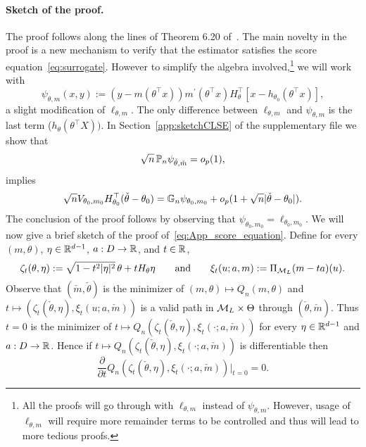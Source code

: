 {\paragraph{Sketch of the proof.} The proof follows along the lines of Theorem 6.20 of~\cite{VdV02}. The main novelty in the proof is a new mechanism to verify that the estimator satisfies the score equation~\eqref{eq:surrogate}.  However to simplify the algebra involved,\footnote{All the proofs will go through with $\ell_{\theta,m}$ instead of $\psi_{\theta, m}$. However, usage of $\ell_{\theta, m}$ will require more remainder terms to be controlled and thus will lead to more tedious proofs.} we will work with 
\begin{equation} \label{eq:App_score}
 \psi_{\theta,m} (x,y) := (y-m(\theta^\top x))m^\prime(\theta^\top x) H_\theta^\top [  x -h_{\theta_0}(\theta^\top x)],
 \end{equation}
 a slight modification of $\ell_{\theta, m}$. The only difference between $\ell_{\theta, m}$ and $\psi_{\theta, m}$ is the last term ($h_{\theta}(\theta^\top X))$. 
 In Section~\ref{app:sketchCLSE} of the supplementary file we show that     \begin{equation}\label{eq:App_score_equation}
   \sqrt{n}\, \mathbb{P}_n \psi_{\check{\theta},\check{m}} =o_p(1),
   \end{equation}
implies 
   \begin{equation}\label{eq:RAL_1}
        \sqrt{n}V_{\theta_0,m_0}  H_{\theta_0}^\top(\check{\theta}- \theta_0)  ={}\mathbb{G}_n \psi_{\theta_0,m_0} + o_p(1+\sqrt{n} |\check{\theta}-\theta_0|).
       \end{equation}    The conclusion of the proof follows by  observing that 
$\psi_{\theta_0,m_0} = {\ell}_{\theta_0,m_0}$. 
We will now give a brief sketch of the proof of~\eqref{eq:App_score_equation}. Define for every $(m, \theta)$,  $\eta\in \mathbb{R}^{d-1}$, $a: D\to \mathbb{R}$, and $t\in \mathbb{R}$, 
\[\zeta_t(\theta,\eta):=\sqrt{1-t^2|\eta|^2}\, \theta + t H_\theta \eta \qquad\text{and}\qquad  \xi_t(u;a, {m}) := \Pi_{\mathcal{M}_L}({m} - t a)(u).
\]
Observe that $(\check{m}, \check{\theta})$ is the minimizer of $(m,\theta) \mapsto Q_n(m,\theta)$ and  $t \mapsto (\zeta_t(\check\theta,\eta), \xi_t(u;a, \check{m}))$ is a valid path in $\mathcal{M}_L\times \Theta$ through $( \check \theta, \check{m})$. Thus  $t=0$ is the minimizer of  $t\mapsto Q_n(\zeta_t(\check\theta,\eta), \xi_t(\cdot;a, \check{m}))$ for every  $\eta\in \mathbb{R}^{d-1}$ and $a: D\to \mathbb{R}$.
Hence if $t\mapsto Q_n(\zeta_t(\check\theta,\eta), \xi_t(\cdot;a, \check{m}))$ is differentiable then 
\begin{equation}\label{eq:derivative_Q_n_equals_zero} \frac{\partial}{\partial t} Q_n(\zeta_t(\check\theta,\eta), \xi_t(\cdot;a, \check{m}))\Big|_{t=0}=0.\end{equation}
}
